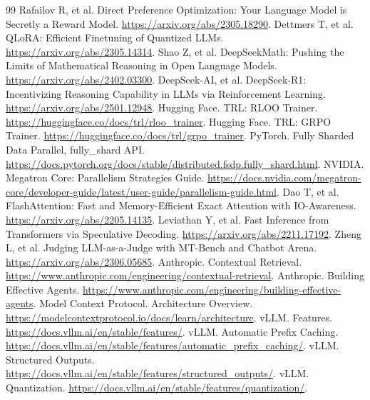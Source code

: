 \documentclass[UTF8,12pt,a4paper,fontset=fandol]{ctexart}
\begin{document}
\begin{thebibliography}{99}
 Rafailov R, et al. Direct Preference Optimization: Your Language Model is Secretly a Reward Model. \url{https://arxiv.org/abs/2305.18290}.
 Dettmers T, et al. QLoRA: Efficient Finetuning of Quantized LLMs. \url{https://arxiv.org/abs/2305.14314}.
 Shao Z, et al. DeepSeekMath: Pushing the Limits of Mathematical Reasoning in Open Language Models. \url{https://arxiv.org/abs/2402.03300}.
 DeepSeek-AI, et al. DeepSeek-R1: Incentivizing Reasoning Capability in LLMs via Reinforcement Learning. \url{https://arxiv.org/abs/2501.12948}.
 Hugging Face. TRL: RLOO Trainer. \url{https://huggingface.co/docs/trl/rloo_trainer}.
 Hugging Face. TRL: GRPO Trainer. \url{https://huggingface.co/docs/trl/grpo_trainer}.
 PyTorch. Fully Sharded Data Parallel, fully\_shard API. \url{https://docs.pytorch.org/docs/stable/distributed.fsdp.fully_shard.html}.
 NVIDIA. Megatron Core: Parallelism Strategies Guide. \url{https://docs.nvidia.com/megatron-core/developer-guide/latest/user-guide/parallelism-guide.html}.
 Dao T, et al. FlashAttention: Fast and Memory-Efficient Exact Attention with IO-Awareness. \url{https://arxiv.org/abs/2205.14135}.
 Leviathan Y, et al. Fast Inference from Transformers via Speculative Decoding. \url{https://arxiv.org/abs/2211.17192}.
 Zheng L, et al. Judging LLM-as-a-Judge with MT-Bench and Chatbot Arena. \url{https://arxiv.org/abs/2306.05685}.
 Anthropic. Contextual Retrieval. \url{https://www.anthropic.com/engineering/contextual-retrieval}.
 Anthropic. Building Effective Agents. \url{https://www.anthropic.com/engineering/building-effective-agents}.
 Model Context Protocol. Architecture Overview. \url{https://modelcontextprotocol.io/docs/learn/architecture}.
 vLLM. Features. \url{https://docs.vllm.ai/en/stable/features/}.
 vLLM. Automatic Prefix Caching. \url{https://docs.vllm.ai/en/stable/features/automatic_prefix_caching/}.
 vLLM. Structured Outputs. \url{https://docs.vllm.ai/en/stable/features/structured_outputs/}.
 vLLM. Quantization. \url{https://docs.vllm.ai/en/stable/features/quantization/}.
\end{thebibliography}
\end{document}
